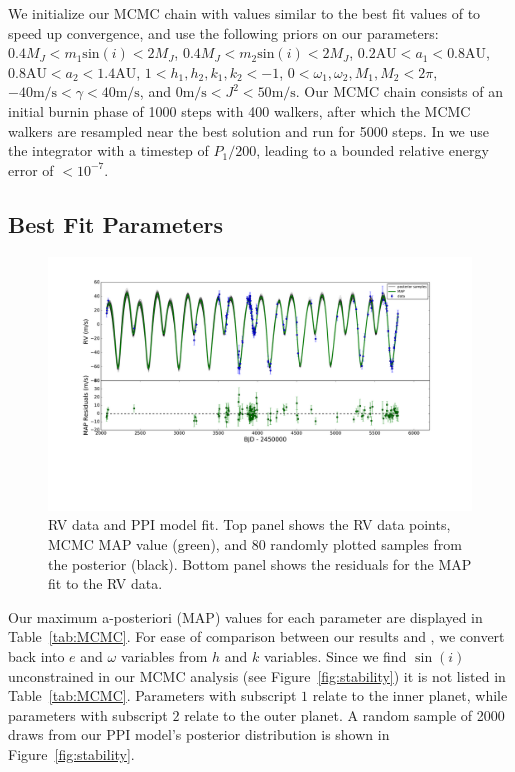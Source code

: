 We initialize our MCMC chain with values similar to the best fit values of \R to speed up convergence, and use the following priors on our parameters: $0.4M_J<m_1\textrm{sin}(i) < 2M_J$, $0.4M_J<m_2\textrm{sin}(i) < 2M_J$, $0.2 \textrm{AU}<a_1< 0.8\textrm{AU}$, $0.8\textrm{AU}<a_2< 1.4\textrm{AU}$, $1<h_1, h_2, k_1, k_2<-1$, $0<\omega_1, \omega_2, M_1, M_2<2\pi$, $-40\textrm{m/s}<\gamma<40\textrm{m/s}$, and $0\textrm{m/s}<J^2<50\textrm{m/s}$.
Our MCMC chain consists of an initial burnin phase of 1000 steps with 400 walkers, after which the MCMC walkers are resampled near the best solution and run for 5000 steps.
In \reb we use the \whfast integrator \citep{Rein2015b} with a timestep of $P_1/200$, leading to a bounded relative energy error of $<10^{-7}$.


\subsection{Best Fit Parameters}
\label{sec:Results}
\begin{figure}
\includegraphics[trim=4.4cm 8cm 4.5cm 0cm, width=\textwidth]{chap6/images/hk_400walk_5000it_chkpt1_MAP_RV.pdf}
\caption{RV data and PPI model fit. 
Top panel shows the RV data points, MCMC MAP value (green), and 80 randomly plotted samples from the posterior (black). 
Bottom panel shows the residuals for the MAP fit to the RV data. 
 }
\label{fig:MCMC}
\end{figure}

Our maximum a-posteriori (MAP) values for each parameter are displayed in Table~\ref{tab:MCMC}. 
For ease of comparison between our results and \R, we convert back into $e$ and $\omega$ variables from $h$ and $k$ variables.
Since we find $\sin(i)$ unconstrained in our MCMC analysis (see Figure~\ref{fig:stability}) it is not listed in Table~\ref{tab:MCMC}.
Parameters with subscript $1$ relate to the inner planet, while parameters with subscript $2$ relate to the outer planet. 
A random sample of 2000 draws from our PPI model's posterior distribution is shown in Figure~\ref{fig:stability}.

